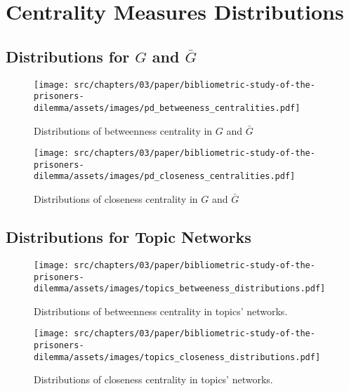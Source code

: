 \section{Centrality Measures Distributions}

\subsection{Distributions for \(G\) and \(\bar{G}\)}

\begin{figure}[!hbtp]
    \centering
    \texttt{[image: src/chapters/03/paper/bibliometric-study-of-the-prisoners-dilemma/assets/images/pd\_betweeness\_centralities.pdf]}
    \caption{Distributions of betweenness centrality in \(G\) and \(\bar{G}\)}
    \label{fig:bc_distributions}
\end{figure}

\begin{figure}[!hbtp]
    \centering
    \texttt{[image: src/chapters/03/paper/bibliometric-study-of-the-prisoners-dilemma/assets/images/pd\_closeness\_centralities.pdf]}
    \caption{Distributions of closeness centrality in \(G\) and \(\bar{G}\)}
    \label{fig:cc_distributions}
\end{figure}

\subsection{Distributions for Topic Networks}\label{appendix:distributions}

\begin{figure}[!hbtp]
    \centering
    \texttt{[image: src/chapters/03/paper/bibliometric-study-of-the-prisoners-dilemma/assets/images/topics\_betweeness\_distributions.pdf]}
    \caption{Distributions of betweenness centrality in topics' networks.}
    \label{fig:bc_distributions_topics}
\end{figure}

\begin{figure}[!hbtp]
    \centering
    \texttt{[image: src/chapters/03/paper/bibliometric-study-of-the-prisoners-dilemma/assets/images/topics\_closeness\_distributions.pdf]}
    \caption{Distributions of closeness centrality in topics' networks.}
    \label{fig:cc_distributions_topics}
\end{figure}
